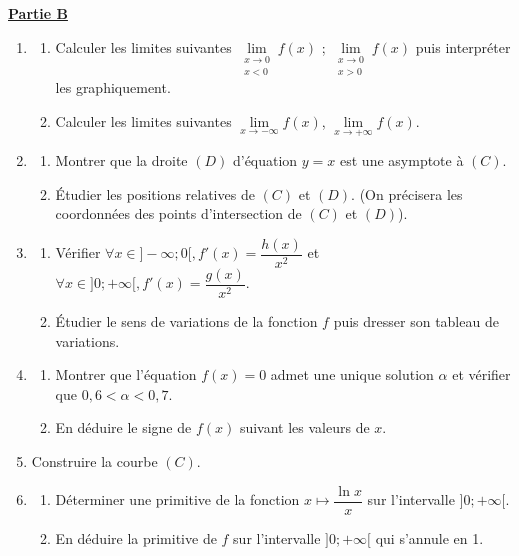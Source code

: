 \documentclass[12pt,a4paper]{article}
\begin{document}
\noindent \underline{\textbf{Partie B}}
\begin{enumerate}
    \item 
    \begin{enumerate}
        \item Calculer les limites suivantes $\lim\limits_{\substack{x \to 0 \\ x < 0}} f(x)$ ; $\lim\limits_{\substack{x \to 0 \\ x > 0}} f(x)$ puis interpréter les graphiquement.
        \item Calculer les limites suivantes $\lim\limits_{x \to -\infty} f(x)$, $\lim\limits_{x \to +\infty} f(x)$.
    \end{enumerate}
    \item 
    \begin{enumerate}
        \item Montrer que la droite $(D)$ d'équation $y = x$ est une asymptote à $(C)$.
        \item Étudier les positions relatives de $(C)$ et $(D)$. (On précisera les coordonnées des points d'intersection de $(C)$ et $(D)$).
    \end{enumerate}
    \item 
    \begin{enumerate}
        \item Vérifier $\forall x \in ]-\infty; 0[, f'(x) = \dfrac{h(x)}{x^2}$ et $\forall x \in ]0; +\infty[, f'(x) = \dfrac{g(x)}{x^2}$.
        \item Étudier le sens de variations de la fonction $f$ puis dresser son tableau de variations.
    \end{enumerate}
    \item 
    \begin{enumerate}
        \item Montrer que l'équation $f(x) = 0$ admet une unique solution $\alpha$ et vérifier que $0,6 < \alpha < 0,7$.
        \item En déduire le signe de $f(x)$ suivant les valeurs de $x$.
    \end{enumerate}
    \item Construire la courbe $(C)$.
    \item 
    \begin{enumerate}
        \item Déterminer une primitive de la fonction $x \mapsto \dfrac{\ln x}{x}$ sur l'intervalle $]0; +\infty[$.
        \item En déduire la primitive de $f$ sur l'intervalle $]0; +\infty[$ qui s'annule en 1.
    \end{enumerate}
\end{enumerate}
\end{document}
